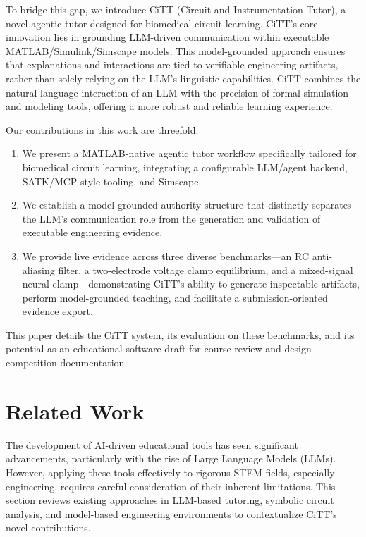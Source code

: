 \documentclass[10pt,twocolumn,letterpaper]{article}
\begin{document}
To bridge this gap, we introduce CiTT (Circuit and Instrumentation Tutor), a novel agentic tutor designed for biomedical circuit learning. CiTT's core innovation lies in grounding LLM-driven communication within executable MATLAB/Simulink/Simscape models. This model-grounded approach ensures that explanations and interactions are tied to verifiable engineering artifacts, rather than solely relying on the LLM's linguistic capabilities. CiTT combines the natural language interaction of an LLM with the precision of formal simulation and modeling tools, offering a more robust and reliable learning experience.

Our contributions in this work are threefold:
\begin{enumerate}
    \item We present a MATLAB-native agentic tutor workflow specifically tailored for biomedical circuit learning, integrating a configurable LLM/agent backend, SATK/MCP-style tooling, and Simscape.
    \item We establish a model-grounded authority structure that distinctly separates the LLM's communication role from the generation and validation of executable engineering evidence.
    \item We provide live evidence across three diverse benchmarks—an RC anti-aliasing filter, a two-electrode voltage clamp equilibrium, and a mixed-signal neural clamp—demonstrating CiTT's ability to generate inspectable artifacts, perform model-grounded teaching, and facilitate a submission-oriented evidence export.
\end{enumerate}
This paper details the CiTT system, its evaluation on these benchmarks, and its potential as an educational software draft for course review and design competition documentation.

\section{Related Work}
\label{sec:related_work}
The development of AI-driven educational tools has seen significant advancements, particularly with the rise of Large Language Models (LLMs). However, applying these tools effectively to rigorous STEM fields, especially engineering, requires careful consideration of their inherent limitations. This section reviews existing approaches in LLM-based tutoring, symbolic circuit analysis, and model-based engineering environments to contextualize CiTT's novel contributions.
\end{document}
